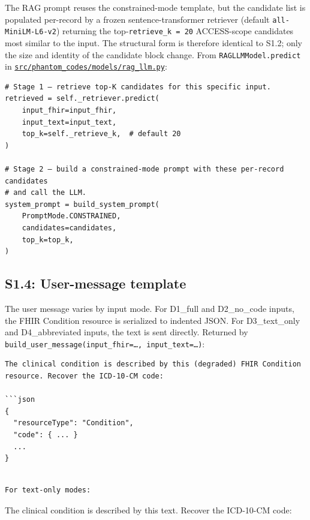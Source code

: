 The RAG prompt reuses the constrained-mode template, but the
candidate list is populated per-record by a frozen
sentence-transformer retriever (default \texttt{all-MiniLM-L6-v2}) returning
the top-\texttt{retrieve\_k\ =\ 20} ACCESS-scope candidates most similar to the
input. The structural form is therefore identical to S1.2; only the
size and identity of the candidate block change. From
\texttt{RAGLLMModel.predict} in
\href{https://github.com/ufbfung/phantom-codes/blob/main/src/phantom_codes/models/rag_llm.py}{\texttt{src/phantom\_codes/models/rag\_llm.py}}:

\begin{verbatim}
# Stage 1 — retrieve top-K candidates for this specific input.
retrieved = self._retriever.predict(
    input_fhir=input_fhir,
    input_text=input_text,
    top_k=self._retrieve_k,  # default 20
)

# Stage 2 — build a constrained-mode prompt with these per-record candidates
# and call the LLM.
system_prompt = build_system_prompt(
    PromptMode.CONSTRAINED,
    candidates=candidates,
    top_k=top_k,
)
\end{verbatim}

\subsection{S1.4: User-message template}\label{s1.4-user-message-template}

The user message varies by input mode. For D1\_full and D2\_no\_code
inputs, the FHIR Condition resource is serialized to indented JSON.
For D3\_text\_only and D4\_abbreviated inputs, the text is sent
directly. Returned by \texttt{build\_user\_message(input\_fhir=…,\ input\_text=…)}:

\begin{verbatim}
The clinical condition is described by this (degraded) FHIR Condition
resource. Recover the ICD-10-CM code:

```json
{
  "resourceType": "Condition",
  "code": { ... }
  ...
}
\end{verbatim}

\begin{verbatim}

For text-only modes:
\end{verbatim}

The clinical condition is described by this text. Recover the
ICD-10-CM code:


